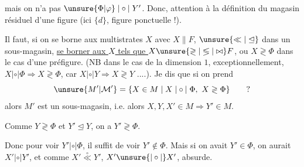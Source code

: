 
\margin{\rule{0.35pt}{1.8cm}\hspace{3pt}\rule{0.35pt}{1.8cm}\hspace{3pt}\rule{0.35pt}{1.8cm}}
mais on n'a pas $\unsure{\Phi|\varphi}\mathrel{|\circ|}Y'$. Donc, attention à la définition du magasin résiduel d'une figure  (ici $\{d\}$, figure ponctuelle !).

Il faut, si on se borne aux multistrates $X$ avec $X\parallel F$,  $\unsure{\ll|\trianglelefteq}$ dans un sous-magasin, \uline{se borner aux $X$ tels que $X\unsure{\gtrless|\lessgtr|\bowtie}F$}, ou $X\gtrless\Phi$ dans le cas d'une préfigure. (NB dans le cas de la dimension $1$, exceptionnellement, $X\mathrel{|\circ|}\Phi\Longrightarrow X\gtrless\Phi$, car $X\mathrel{|\circ|}Y\Longrightarrow X\gtrless Y$ ....). Je dis que si on prend
\[
\unsure{M'|\mathcal M'}=\{X\in M\mid X\mathrel{|\circ|}\Phi,\ X\gtrless\Phi\}\qquad ?
\]
alors $M'$ est un sous-magasin, i.e.
alors $X,Y,X'\in M\Longrightarrow Y'\in M$.

Comme $Y\gtrless\Phi$ et $Y'\trianglelefteq Y$, on a $Y'\gtrless\Phi$.

Donc pour voir $Y'\mathrel{|\circ|}\Phi$, il suffit de voir $Y'\notin\Phi$. Mais si on avait $Y'\in\Phi$, on aurait $X'\mathrel{|\circ|}Y'$, et comme $X'\overset{\circ}{\ll}Y'$, $X'\unsure{\mathrel{|\circ|}}X'$, absurde.
